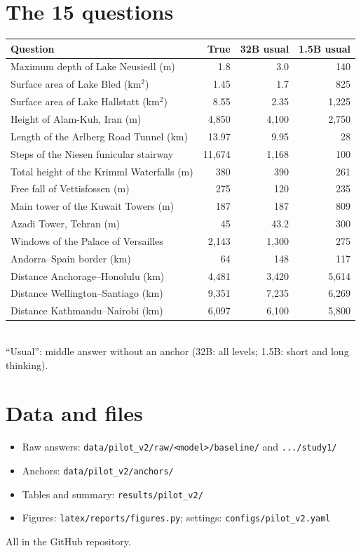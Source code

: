 \documentclass[11pt,a4paper]{article}
\begin{document}
\section{The 15 questions}
\begin{center}\small
\begin{tabularx}{\textwidth}{@{}Lrrr@{}}
\toprule
Question & True & 32B usual & 1.5B usual \\
\midrule
Maximum depth of Lake Neusiedl (m) & 1.8 & 3.0 & 140 \\
Surface area of Lake Bled (km$^2$) & 1.45 & 1.7 & 825 \\
Surface area of Lake Hallstatt (km$^2$) & 8.55 & 2.35 & 1,225 \\
Height of Alam-Kuh, Iran (m) & 4,850 & 4,100 & 2,750 \\
Length of the Arlberg Road Tunnel (km) & 13.97 & 9.95 & 28 \\
Steps of the Niesen funicular stairway & 11,674 & 1,168 & 100 \\
Total height of the Krimml Waterfalls (m) & 380 & 390 & 261 \\
Free fall of Vettisfossen (m) & 275 & 120 & 235 \\
Main tower of the Kuwait Towers (m) & 187 & 187 & 809 \\
Azadi Tower, Tehran (m) & 45 & 43.2 & 300 \\
Windows of the Palace of Versailles & 2,143 & 1,300 & 275 \\
Andorra--Spain border (km) & 64 & 148 & 117 \\
Distance Anchorage--Honolulu (km) & 4,481 & 3,420 & 5,614 \\
Distance Wellington--Santiago (km) & 9,351 & 7,235 & 6,269 \\
Distance Kathmandu--Nairobi (km) & 6,097 & 6,100 & 5,800 \\
\bottomrule
\end{tabularx}\\[2pt]
{\footnotesize \enquote{Usual}: middle answer without an anchor (32B: all levels; 1.5B: short and long thinking).}
\end{center}

\section{Data and files}
\begin{itemize}[leftmargin=*]
  \item Raw answers: \texttt{data/pilot\_v2/raw/<model>/baseline/} and \texttt{.../study1/}
  \item Anchors: \texttt{data/pilot\_v2/anchors/}
  \item Tables and summary: \texttt{results/pilot\_v2/}
  \item Figures: \texttt{latex/reports/figures.py}; settings: \texttt{configs/pilot\_v2.yaml}
\end{itemize}
All in the GitHub repository.



\end{document}
